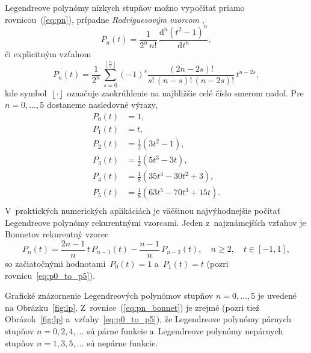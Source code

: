 \documentclass[a4paper,12pt]{book}
\newcommand{\diff}{\mathrm d}
\begin{document}
Legendreove polynómy nízkych stupňov možno vypočítať priamo
rovnicou~(\ref{eq:pn}), prípadne \emph{Rodriguesovým vzorcom}
\parencite{SansoGeoidDetermination},
%
\begin{equation}
\label{eq:pn_rodrigues}
P_n(t) = \frac{1}{2^n \, n!} \, \frac{\diff^n (t^2 - 1)^n}{\diff t^n}{,}
\end{equation}
%
či explicitným vzťahom \parencite{Freeden2009}
%
\begin{equation}
P_n(t) = \frac{1}{2^n} \, \sum_{s = 0}^{\left\lfloor \frac{n}{2} \right\rfloor}
(-1)^s \frac{(2n - 2s)!}{s!  \, (n - s)! \, (n - 2s)!} \, t^{n - 2s}{,}
\end{equation}
%
kde symbol~$\left\lfloor \cdot \right\rfloor$ označuje zaokrúhlenie na
najbližšie celé číslo smerom nadol.  Pre $n = 0, \dots, 5$ dostaneme nasledovné
výrazy,
%
\begin{equation}
\label{eq:p0_to_p5}
\begin{split}
P_0(t) & = 1{,}\\
P_1(t) & = t{,}\\
P_2(t) & = \frac{1}{2} \left( 3t^2  - 1 \right){,}\\
P_3(t) & = \frac{1}{2} (5t^3 - 3t){,}\\
P_4(t) & = \frac{1}{8}(35t^4 - 30t^2 + 3){,}\\
P_5(t) & = \frac{1}{8}(63t^5 - 70t^3 + 15t){.}\\
\end{split}
\end{equation}
%
V~praktických numerických aplikáciách je väčšinou najvýhodnejšie počítať
Legendreove polynómy rekurentnými vzorcami.  Jeden z~najznámejších vzťahov je
Bonnetov rekurentný vzorec
%
\begin{equation}
\label{eq:pn_bonnet}
P_n(t) = \frac{2n - 1}{n} \, t \, P_{n - 1}(t) - \frac{n - 1}{n} \, P_{n
- 2}(t){,} \quad n \geq 2{,} \quad t \in [-1, 1]{,}
\end{equation}
%
so začiatočnými hodnotami~$P_0(t) = 1$ a~$P_1(t) = t$ (pozri
rovnicu~\ref{eq:p0_to_p5}).

Grafické znázornenie Legendreových polynómov stupňov $n =0, \dots, 5$ je
uvedené na Obrázku~\ref{fig:lp}.  Z~rovnice~(\ref{eq:pn_bonnet}) je zrejmé
(pozri tiež Obrázok~\ref{fig:lp} a~vzťahy~\ref{eq:p0_to_p5}), že Legendreove
polynómy párnych stupňov $n = 0, 2, 4, \dots$ sú párne funkcie a~Legendreove
polynómy nepárnych stupňov $n = 1, 3, 5, \dots$ sú nepárne funkcie.
\end{document}
